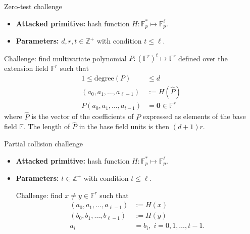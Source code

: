 \documentclass[t,8pt]{beamer}
\begin{document}
\begin{frame}{Zero-test challenge}

\begin{itemize}
    \item
\textbf{Attacked primitive:} hash function $H:\mathbb{F}_p^{*}\mapsto \mathbb{F}_p^{\ell}$.
\item
\textbf{Parameters:} $d,r,t\in\mathbb{Z}^{+}$ with condition $t\leq \ell$.

\end{itemize}
Challenge: find multivariate polynomial  $P:\left(\mathbb{F}^r\right)^t\mapsto\mathbb{F}^r$ defined over the extension field $\mathbb{F}^r$ such that
\begin{align}
1\leq \mathrm{degree}(P)&\leq d\\
(a_0,a_1,\ldots,a_{\ell-1}) &:=H(\widehat{P}) \\
P(a_0,a_1, \ldots,a_{t-1})&=\mathbf{0}\in\mathbb{F}^r\label{eq:cond-zero}
\end{align}
where $\widehat{P}$ is the vector of the coefficients of $P$ expressed as elements of the base field $\mathbb{F}$. The length of  $\widehat{P}$ in the base field units is then $(d+1)r$.
\end{frame}

\begin{frame}{Partial collision challenge}

\begin{itemize}
    \item
\textbf{Attacked primitive:} hash function $H:\mathbb{F}_p^{*}\mapsto \mathbb{F}_p^{\ell}$.
\item
\textbf{Parameters:} $ t\in\mathbb{Z}^{+}$ with condition $t\leq \ell$.

Challenge: find $x\neq y\in\mathbb{F}^r$ such that
\begin{align}
(a_0,a_1,\ldots,a_{\ell-1}) &:=H(x) \\
(b_0,b_1,\ldots,b_{\ell-1}) &:=H(y) \\
a_i &= b_i ,\; i=0,1,\ldots,t-1.
\end{align}

\end{itemize}

\end{frame}
\end{document}
